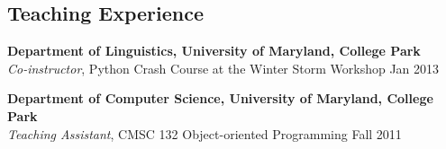 \documentclass[margin,line]{resume}
\begin{document}
\begin{resume}
%
\section{\sc Teaching Experience} 
%  
{\bf Department of Linguistics, University of Maryland, College Park}\\
  \emph{Co-instructor}, Python Crash Course at the Winter Storm Workshop \hfill Jan 2013

{\bf Department of Computer Science, University of Maryland, College Park}\\
  \emph{Teaching Assistant}, CMSC 132 Object-oriented Programming \hfill Fall 2011
  

\end{resume}
\end{document}
